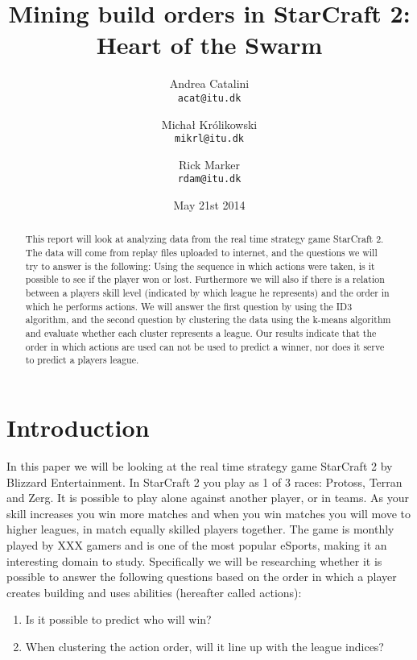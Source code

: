\documentclass[a4paper,11pt]{article}
\begin{document}
\graphicspath{ {./images/} }
\date{May 21st 2014}
\title{Mining build orders in StarCraft 2: Heart of the Swarm}

\author{Andrea Catalini\\
\texttt{acat@itu.dk}
\and Michał Królikowski\\
\texttt{mikrl@itu.dk}
\and Rick Marker\\
\texttt{rdam@itu.dk}}

\clearpage\maketitle
\thispagestyle{empty}
\setcounter{page}{1}
\begin{abstract}
This report will look at analyzing data from the real time strategy game StarCraft 2.
The data will come from replay files uploaded to internet, and the questions we will try to answer is the following: Using the sequence in which actions were taken, is it possible to see if the player won or lost. Furthermore we will also if there is a relation between a players skill level (indicated by which league he represents) and the order in which he performs actions.
We will answer the first question by using the ID3 algorithm, and the second question by clustering the data using the k-means algorithm and evaluate whether each cluster represents a league.
Our results indicate that the order in which actions are used can not be used to predict a winner, nor does it serve to predict a players league.
\end{abstract}


\section{Introduction}
In this paper we will be looking at the real time strategy game StarCraft 2 by Blizzard Entertainment. 
In StarCraft 2 you play as 1 of 3 races: Protoss, Terran and Zerg. It is possible to play alone against another player, or in teams. As your skill increases you win more matches and when you win matches you will move to higher leagues, in match equally skilled players together. The game is monthly played by XXX gamers and is one of the most popular eSports, making it an interesting domain to study.
Specifically we will be researching whether it is possible to answer the following questions based on the order in which a player creates building and uses abilities (hereafter called actions):
\begin{enumerate}
\item Is it possible to predict who will win?\label{q:win}
\item When clustering the action order, will it line up with the league indices?\label{q:league}
\end{enumerate}
\end{document}
